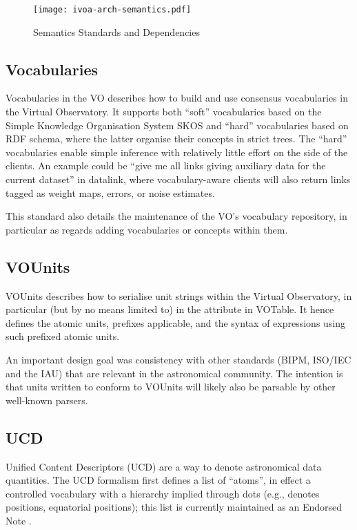 \documentclass[11pt,letter]{ivoa}
\begin{document}
\begin{figure}[ht]
\centering
\texttt{[image: ivoa-arch-semantics.pdf]}
\caption{Semantics Standards and Dependencies}
\label{fig:semdeps}
\end{figure}

\subsection{Vocabularies}

Vocabularies in the VO \citep{2023ivoa.spec.0206D} describes how to
build and use
consensus vocabularies in the Virtual Observatory.  It supports both
``soft'' vocabularies based on the Simple Knowledge Organisation System
SKOS and ``hard'' vocabularies based on RDF schema, where the latter
organise their concepts in strict trees.  The ``hard'' vocabularies
enable simple inference with relatively little effort on the side of
the clients.  An example could be ``give me all links giving auxiliary
data for the current dataset'' in datalink, where vocabulary-aware
clients will also return links tagged as weight maps, errors, or noise
estimates.

This standard also details the maintenance of the VO's vocabulary
repository, in particular as regards adding vocabularies or concepts
within them.

\subsection{VOUnits}

VOUnits \citep{2023ivoa.spec.1215G} describes how to serialise unit
strings within the Virtual
Observatory, in particular (but by no means limited to) in the
 attribute in VOTable.  It hence defines the atomic units,
prefixes applicable, and the syntax of expressions using such prefixed
atomic units. 

An important design goal was consistency with other standards (BIPM,
ISO/IEC and the IAU) that are relevant in the astronomical community.
The intention is that units written to conform to VOUnits will likely
also be parsable by other well-known parsers.

\subsection{UCD}

Unified Content Descriptors (UCD) \citep{2019ivoa.spec.1007G} are a way
to
denote astronomical data
quantities.  The UCD formalism first defines a list of ``atoms'', in
effect a controlled vocabulary with a hierarchy implied through dots
(e.g.,  denotes positions,  equatorial positions);
this list is currently maintained as an Endorsed Note
\citep{2023ivoa.spec.0125C}.
\end{document}
